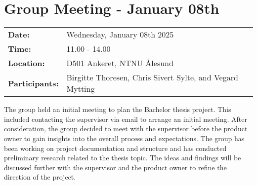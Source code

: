 \section{Group Meeting - January 08th}
\begin{tabular}{ll}
    \textbf{Date:} & Wednesday, January 08th 2025 \\
    \textbf{Time:} & 11.00 - 14.00\\
    \textbf{Location:} & D501 Ankeret, NTNU Ålesund \\
    \textbf{Participants:} & Birgitte Thoresen, Chris Sivert Sylte, and Vegard Mytting\\
\end{tabular}

\vspace{0.5cm}

The group held an initial meeting to plan the Bachelor thesis project. This included contacting the supervisor via email to arrange an initial meeting. After consideration, the group decided to meet with the supervisor before the product owner to gain insights into the overall process and expectations. The group has been working on project documentation and structure and has conducted preliminary research related to the thesis topic. The ideas and findings will be discussed further with the supervisor and the product owner to refine the direction of the project.